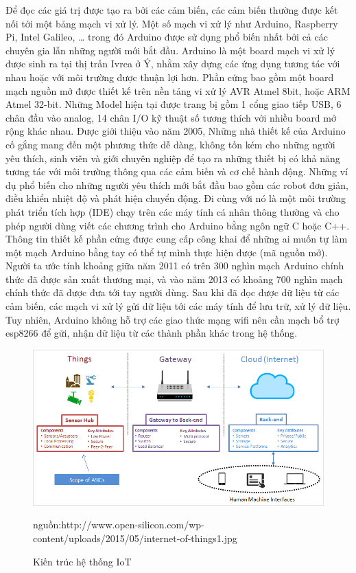 Để đọc các giá trị được tạo ra bởi các cảm biến, các cảm biến thường được kết nối tới một bảng mạch vi xử lý. Một số mạch vi xử lý như Arduino, Raspberry Pi, Intel Galileo, … trong đó Arduino được sử dụng phổ biến nhất bởi cả các chuyên gia lẫn những người mới bắt đầu. Arduino là một board mạch vi xử lý được sinh ra tại thị trấn Ivrea ở Ý, nhằm xây dựng các ứng dụng tương tác với nhau hoặc với môi trường được thuận lợi hơn. Phần cứng bao gồm một board mạch nguồn mở được thiết kế trên nền tảng vi xử lý AVR Atmel 8bit, hoặc ARM Atmel 32-bit. Những Model hiện tại được trang bị gồm 1 cổng giao tiếp USB, 6 chân đầu vào analog, 14 chân I/O kỹ thuật số tương thích với nhiều board mở rộng khác nhau. Được giới thiệu vào năm 2005, Những nhà thiết kế của Arduino cố gắng mang đến một phương thức dễ dàng, không tốn kém cho những người yêu thích, sinh viên và giới chuyên nghiệp để tạo ra những thiết bị có khả năng tương tác với môi trường thông qua các cảm biến và cơ chế hành động. Những ví dụ phổ biến cho những người yêu thích mới bắt đầu bao gồm các robot đơn giản, điều khiển nhiệt độ và phát hiện chuyển động. Đi cùng với nó là một môi trường phát triển tích hợp (IDE) chạy trên các máy tính cá nhân thông thường và cho phép người dùng viết các chương trình cho Arduino bằng ngôn ngữ C hoặc C++. Thông tin thiết kế phần cứng được cung cấp công khai để những ai muốn tự làm một mạch Arduino bằng tay có thể tự mình thực hiện được (mã nguồn mở). Người ta ước tính khoảng giữa năm 2011 có trên 300 nghìn mạch Arduino chính thức đã được sản xuất thương mại, và vào năm 2013 có khoảng 700 nghìn mạch chính thức đã được đưa tới tay người dùng. 
Sau khi đã đọc được dữ liệu từ các cảm biến, các mạch vi xử lý gửi dữ liệu tới các máy tính để lưu trữ, xử lý dữ liệu. Tuy nhiên, Arduino không hỗ trợ các giao thức mạng wifi nên cần mạch bổ trợ esp8266 để gửi, nhận dữ liệu từ các thành phần khác trong hệ thống.

\clearpage
\begin{figure}[h!]
	\center
	\includegraphics[scale=0.6]{image/internet-of-things1}
	\caption{Kiến trúc hệ thống IoT}
	nguồn:http://www.open-silicon.com/wp-content/uploads/2015/05/internet-of-things1.jpg
	\label{fig:iot}
\end{figure}


